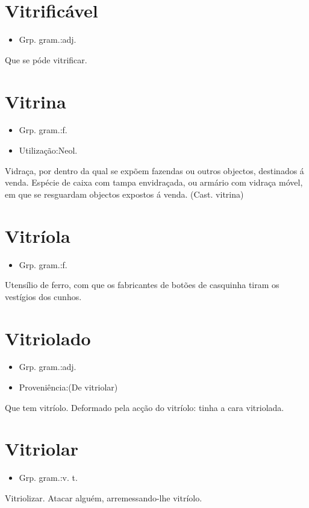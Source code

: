 \documentclass{article}
\begin{document}
\section{Vitrificável}
\begin{itemize}
\item {Grp. gram.:adj.}
\end{itemize}
Que se póde vitrificar.
\section{Vitrina}
\begin{itemize}
\item {Grp. gram.:f.}
\end{itemize}
\begin{itemize}
\item {Utilização:Neol.}
\end{itemize}
Vidraça, por dentro da qual se expõem fazendas ou outros objectos, destinados á venda.
Espécie de caixa com tampa envidraçada, ou armário com vidraça móvel, em que se resguardam objectos expostos á venda.
(Cast. \textunderscore vitrina\textunderscore )
\section{Vitríola}
\begin{itemize}
\item {Grp. gram.:f.}
\end{itemize}
Utensílio de ferro, com que os fabricantes de botões de casquinha tiram os vestígios dos cunhos.
\section{Vitriolado}
\begin{itemize}
\item {Grp. gram.:adj.}
\end{itemize}
\begin{itemize}
\item {Proveniência:(De \textunderscore vitriolar\textunderscore )}
\end{itemize}
Que tem vitríolo.
Deformado pela acção do vitríolo: \textunderscore tinha a cara vitriolada\textunderscore .
\section{Vitriolar}
\begin{itemize}
\item {Grp. gram.:v. t.}
\end{itemize}
Vitriolizar.
Atacar alguém, arremessando-lhe vitríolo.
\end{document}
